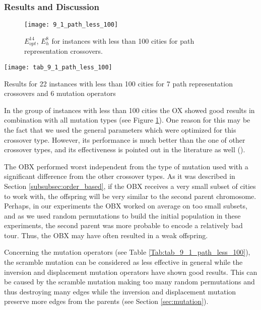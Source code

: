 \subsubsection{Results and Discussion}

\begin{figure}[t] \centering
	\centering
	\texttt{[image: 9\_1\_path\_less\_100]}
	\caption{$E_{opt}^{14}$, $E_{h}^{8}$ for instances with less than 100 cities for path representation crossovers.}
	\label{fig:9_1_path_less_100}
\end{figure}

\begin{table}[t] \centering
	\centering
	\texttt{[image: tab\_9\_1\_path\_less\_100]}
	\caption{Results for 22 instances with less than 100 cities for 7 path representation crossovers and 6 mutation operators}
	\label{Tab:tab_9_1_path_less_100}
\end{table}

In the group of instances with less than 100 cities the OX showed good results in combination with all mutation types (see Figure \ref{fig:9_1_path_less_100}). One reason for this may be the fact that we used the general parameters which were optimized for this crossover type. However, its performance is much better than the one of other crossover types, and its effectiveness is pointed out in the literature as well (\cite{potvin1996genetic}).\par

The OBX performed worst independent from the type of mutation used with a significant difference from the other crossover types. As it was described in Section \ref{subsubsec:order_based}, if the OBX receives a very small subset of cities to work with, the offspring will be very similar to the second parent chromosome. Perhaps, in our experiments the OBX worked on average on too small subsets, and as we used random permutations to build the initial population in these experiments, the second parent was more probable to encode a relatively bad tour. Thus, the OBX may have often resulted in a weak offspring. \par

Concerning the mutation operators (see Table \ref{Tab:tab_9_1_path_less_100}), the scramble mutation can be considered as less effective in general while the inversion and displacement mutation operators have shown good results. This can be caused by the scramble mutation making too many random permutations and thus destroying many edges while the inversion and displacement mutation preserve more edges from the parents (see Section \ref{sec:mutation}).\par

